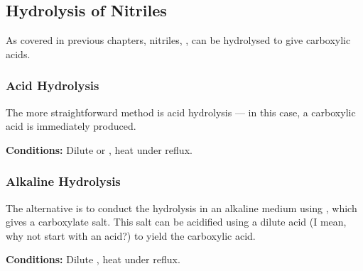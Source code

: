 


		\subsection{Hydrolysis of Nitriles}

			As covered in previous chapters, nitriles, , can be hydrolysed to give carboxylic acids.

			\subsubsection{Acid Hydrolysis}

				The more straightforward method is acid hydrolysis –– in this case, a carboxylic acid is immediately produced.

				\vspace{1.5em}
				\vbox{\textbf{Conditions:}	\tabto{35mm}Dilute  or , heat under reflux.}



			\subsubsection{Alkaline Hydrolysis}

				The alternative is to conduct the hydrolysis in an alkaline medium using , which gives a carboxylate salt.
				This salt can be acidified using a dilute acid (I mean, why not start with an acid?) to yield the carboxylic acid.

				\vspace{1.5em}
				\vbox{\textbf{Conditions:}	\tabto{35mm}Dilute , heat under reflux.}



